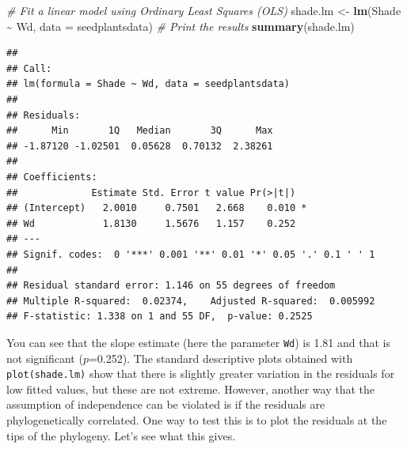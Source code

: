 \documentclass[
]{book}
\newenvironment{Shaded}{\begin{snugshade}}{\end{snugshade}}
\newcommand{\AttributeTok}[1]{\textcolor[rgb]{0.13,0.29,0.53}{#1}}
\newcommand{\CommentTok}[1]{\textcolor[rgb]{0.56,0.35,0.01}{\textit{#1}}}
\newcommand{\FunctionTok}[1]{\textcolor[rgb]{0.13,0.29,0.53}{\textbf{#1}}}
\newcommand{\NormalTok}[1]{#1}
\newcommand{\OtherTok}[1]{\textcolor[rgb]{0.56,0.35,0.01}{#1}}
\newcommand{\SpecialCharTok}[1]{\textcolor[rgb]{0.81,0.36,0.00}{\textbf{#1}}}
\begin{document}
\begin{Shaded}
\begin{Highlighting}[]
\CommentTok{\# Fit a linear model using Ordinary Least Squares (OLS)}
\NormalTok{shade.lm }\OtherTok{\textless{}{-}} \FunctionTok{lm}\NormalTok{(Shade }\SpecialCharTok{\textasciitilde{}}\NormalTok{ Wd, }\AttributeTok{data =}\NormalTok{ seedplantsdata)}
\CommentTok{\# Print the results}
\FunctionTok{summary}\NormalTok{(shade.lm)}
\end{Highlighting}
\end{Shaded}

\begin{verbatim}
## 
## Call:
## lm(formula = Shade ~ Wd, data = seedplantsdata)
## 
## Residuals:
##      Min       1Q   Median       3Q      Max 
## -1.87120 -1.02501  0.05628  0.70132  2.38261 
## 
## Coefficients:
##             Estimate Std. Error t value Pr(>|t|)  
## (Intercept)   2.0010     0.7501   2.668    0.010 *
## Wd            1.8130     1.5676   1.157    0.252  
## ---
## Signif. codes:  0 '***' 0.001 '**' 0.01 '*' 0.05 '.' 0.1 ' ' 1
## 
## Residual standard error: 1.146 on 55 degrees of freedom
## Multiple R-squared:  0.02374,    Adjusted R-squared:  0.005992 
## F-statistic: 1.338 on 1 and 55 DF,  p-value: 0.2525
\end{verbatim}

You can see that the slope estimate (here the parameter \texttt{Wd}) is 1.81 and that is not significant (\(p\)=0.252). The standard descriptive plots obtained with \texttt{plot(shade.lm)} show that there is slightly greater variation in the residuals for low fitted values, but these are not extreme. However, another way that the assumption of independence can be violated is if the residuals are phylogenetically correlated. One way to test this is to plot the residuals at the tips of the phylogeny. Let's see what this gives.
\end{document}
